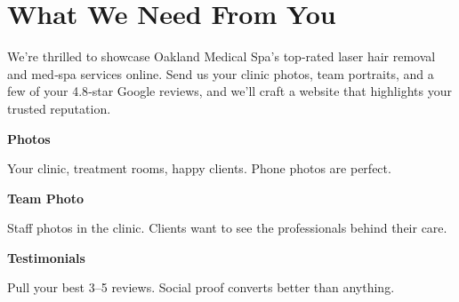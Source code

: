 \documentclass[11pt,letterpaper]{article}
\begin{document}
\vspace{0.2em}

\section*{What We Need From You}

We’re thrilled to showcase Oakland Medical Spa’s top‑rated laser hair removal and med‑spa services online. Send us your clinic photos, team portraits, and a few of your 4.8‑star Google reviews, and we’ll craft a website that highlights your trusted reputation.

\vspace{0.12em}

\noindent\begin{minipage}[t]{0.48\textwidth}
\begin{tcolorbox}[colframe=accent-teal, boxrule=1pt, left=0.7em, right=0.7em, top=0.5em, bottom=0.5em, arc=4pt, boxsep=0pt]
{\bfseries\small\color{accent-teal}Photos}

\vspace{0.15em}

{\small Your clinic, treatment rooms, happy clients. Phone photos are perfect.}
\end{tcolorbox}

\vspace{0.1em}

\begin{tcolorbox}[colframe=accent-teal, boxrule=1pt, left=0.7em, right=0.7em, top=0.5em, bottom=0.5em, arc=4pt, boxsep=0pt]
{\bfseries\small\color{accent-teal}Team Photo}

\vspace{0.15em}

{\small Staff photos in the clinic. Clients want to see the professionals behind their care.}
\end{tcolorbox}

\vspace{0.1em}

\begin{tcolorbox}[colframe=accent-teal, boxrule=1pt, left=0.7em, right=0.7em, top=0.5em, bottom=0.5em, arc=4pt, boxsep=0pt]
{\bfseries\small\color{accent-teal}Testimonials}

\vspace{0.15em}

{\small Pull your best 3--5 reviews. Social proof converts better than anything.}
\end{tcolorbox}
\end{minipage}
\end{document}
